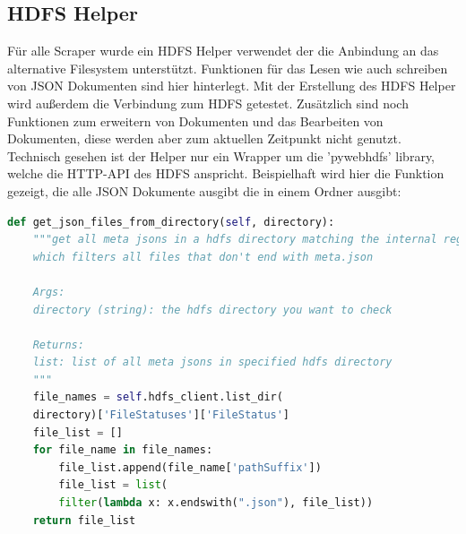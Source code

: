 \documentclass[12pt,oneside,a4paper,parskip]{scrbook}
\begin{document}
\subsection{HDFS Helper}
F\"ur alle Scraper wurde ein HDFS Helper verwendet der die Anbindung an das alternative Filesystem unterst\"utzt. Funktionen f\"ur das Lesen wie auch schreiben von JSON Dokumenten sind hier hinterlegt.
Mit der Erstellung des HDFS Helper wird außerdem die Verbindung zum HDFS getestet. Zus\"atzlich sind noch Funktionen zum erweitern von Dokumenten und das Bearbeiten von Dokumenten, diese werden aber zum aktuellen Zeitpunkt nicht genutzt. \newline
Technisch gesehen ist der Helper nur ein Wrapper um die 'pywebhdfs' library, welche die HTTP-API des HDFS anspricht.
Beispielhaft wird hier die Funktion gezeigt, die alle JSON Dokumente ausgibt die in einem Ordner ausgibt:
\begin{lstlisting}[basicstyle=\small, caption=HDFS Helper Beispiel ,label=hdfsHelperJsonInDoc,language=python]
def get_json_files_from_directory(self, directory):
	"""get all meta jsons in a hdfs directory matching the internal regex pattern
	which filters all files that don't end with meta.json

	Args:
	directory (string): the hdfs directory you want to check

	Returns:
	list: list of all meta jsons in specified hdfs directory
	"""
	file_names = self.hdfs_client.list_dir(
	directory)['FileStatuses']['FileStatus']
	file_list = []
	for file_name in file_names:
		file_list.append(file_name['pathSuffix'])
		file_list = list(
		filter(lambda x: x.endswith(".json"), file_list))
	return file_list

\end{lstlisting}
\pagebreak
\end{document}
